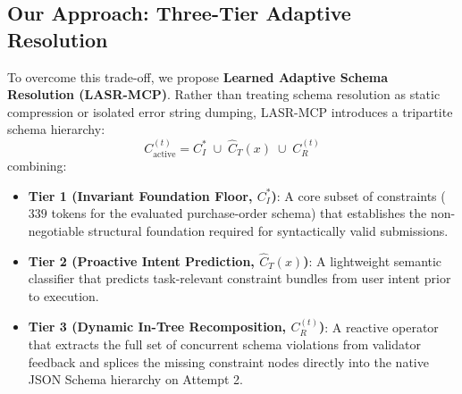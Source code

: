 \subsection{Our Approach: Three-Tier Adaptive Resolution}
To overcome this trade-off, we propose \textbf{Learned Adaptive Schema Resolution (LASR-MCP)}. Rather than treating schema resolution as static compression or isolated error string dumping, LASR-MCP introduces a tripartite schema hierarchy:
\begin{equation}
C_{\text{active}}^{(t)} = C_I^* \;\cup\; \hat{C}_T(x) \;\cup\; C_R^{(t)}
\end{equation}
combining:
\begin{itemize}
    \item \textbf{Tier 1 (Invariant Foundation Floor, $C_I^*$)}: A core subset of constraints ($339$ tokens for the evaluated purchase-order schema) that establishes the non-negotiable structural foundation required for syntactically valid submissions.
    \item \textbf{Tier 2 (Proactive Intent Prediction, $\hat{C}_T(x)$)}: A lightweight semantic classifier that predicts task-relevant constraint bundles from user intent prior to execution.
    \item \textbf{Tier 3 (Dynamic In-Tree Recomposition, $C_R^{(t)}$)}: A reactive operator that extracts the full set of concurrent schema violations from validator feedback and splices the missing constraint nodes directly into the native JSON Schema hierarchy on Attempt 2.
\end{itemize}

